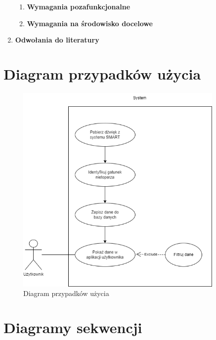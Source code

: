 \documentclass{sprz}
\begin{document}
\begin{enumerate}[label=\textbf{\arabic*}.]
\begin{enumerate}[font=\bfseries]
      \item \textbf{Wymagania pozafunkcjonalne}
      


      \item \textbf{Wymagania na środowisko docelowe}
      


    \end{enumerate}

  \item \textbf{Odwołania do literatury}
\end{enumerate}

\clearpage

\section{Diagram przypadków użycia}
\begin{figure}[h]
  \centering
  \includegraphics[width=0.9\textwidth]{sprz/use-case}
  \caption{Diagram przypadków użycia}
  \label{img:use-case}
\end{figure}

\clearpage

\section{Diagramy sekwencji}
\end{document}
